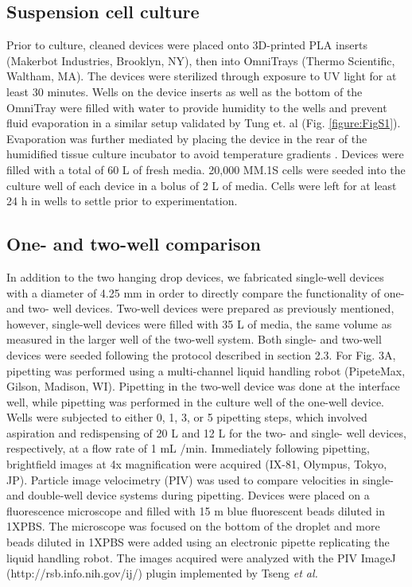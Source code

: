 \subsection{Suspension cell culture}
Prior to culture, cleaned devices were placed onto 3D-printed PLA inserts (Makerbot Industries, Brooklyn, NY), then into OmniTrays (Thermo Scientific, Waltham, MA). The devices were sterilized through exposure to UV light for at least 30 minutes. Wells on the device inserts as well as the bottom of the OmniTray were filled with water to provide humidity to the wells and prevent fluid evaporation in a similar setup validated by Tung et. al \cite{Tung2011} (Fig. \ref{figure:FigS1}). Evaporation was further mediated by placing the device in the rear of the humidified tissue culture incubator to avoid temperature gradients \cite{Berthier2008}. Devices were filled with a total of 60 \textmu L of fresh media. 20,000 MM.1S cells were seeded into the culture well of each device in a bolus of 2 \textmu L of media. Cells were left for at least 24 h in wells to settle prior to experimentation.  

\subsection{One- and two-well comparison}
In addition to the two hanging drop devices, we fabricated single-well devices with a diameter of 4.25 mm in order to directly compare the functionality of one- and two- well devices. Two-well devices were prepared as previously mentioned, however, single-well devices were filled with 35 \textmu L of media, the same volume as measured in the larger well of the two-well system. Both single- and two-well devices were seeded following the protocol described in section 2.3. 
For Fig. 3A, pipetting was performed using a multi-channel liquid handling robot (PipeteMax, Gilson, Madison, WI). Pipetting in the two-well device was done at the interface well, while pipetting was performed in the culture well of the one-well device. Wells were subjected to either 0, 1, 3, or 5 pipetting steps, which involved aspiration and redispensing of 20 \textmu L and 12 \textmu L for the two- and single- well devices, respectively, at a flow rate of 1 mL /min. Immediately following pipetting, brightfield images at 4x magnification were acquired (IX-81, Olympus, Tokyo, JP).
Particle image velocimetry (PIV) was used to compare velocities in single- and double-well device systems during pipetting. Devices were placed on a fluorescence microscope and filled with 15 m blue fluorescent beads diluted in 1XPBS. The microscope was focused on the bottom of the droplet and more beads diluted in 1XPBS were added using an electronic pipette replicating the liquid handling robot. The images acquired were analyzed with the PIV ImageJ (http://rsb.info.nih.gov/ij/) plugin implemented by Tseng \textit{et al.}  \cite{Tseng2012}


